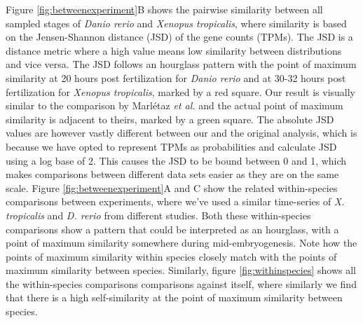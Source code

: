 Figure \ref{fig:betweenexperiment}B shows the pairwise similarity between all sampled stages of \textit{Danio rerio} and \textit{Xenopus tropicalis}, where similarity is based on the Jensen-Shannon distance (JSD) of the gene counts (TPMs). The JSD is a distance metric where a high value means low similarity between distributions and vice versa. The JSD follows an hourglass pattern with the point of maximum similarity at 20 hours post fertilization for \textit{Danio rerio} and at 30-32 hours post fertilization for \textit{Xenopus tropicalis}, marked by a red square. Our result is visually similar to the comparison by Marl\'etaz \textit{et al.} and the actual point of maximum similarity is adjacent to theirs, marked by a green square. The absolute JSD values are however vastly different between our and the original analysis, which is because we have opted to represent TPMs as probabilities and calculate JSD using a log base of 2. This causes the JSD to be bound between 0 and 1, which makes comparisons between different data sets easier as they are on the same scale. Figure \ref{fig:betweenexperiment}A and C show the related within-species comparisons between experiments, where we've used a similar time-series of \textit{X. tropicalis} and \textit{D. rerio} from different studies. Both these within-species comparisons show a pattern that could be interpreted as an hourglass, with a point of maximum similarity somewhere during mid-embryogenesis. Note how the points of maximum similarity within species closely match with the points of maximum similarity between species. Similarly, figure \ref{fig:withinspecies} shows all the within-species comparisons comparisons against itself, where similarly we find that there is a high self-similarity at the point of maximum similarity between species.

